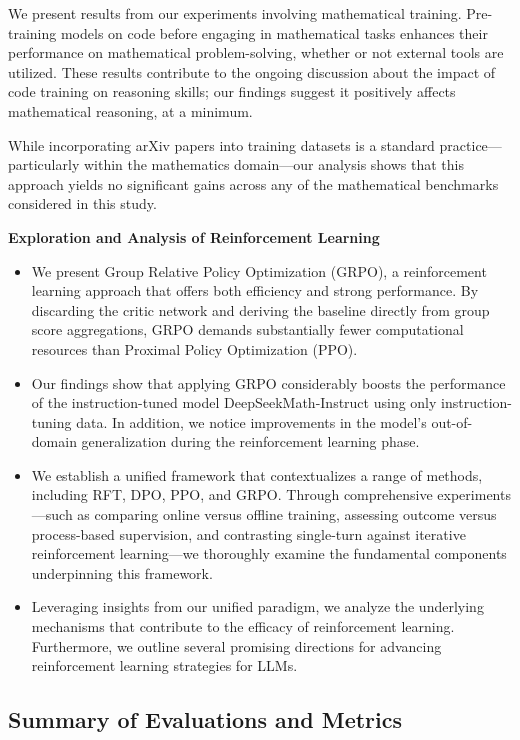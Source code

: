\item We present results from our experiments involving mathematical training. Pre-training models on code before engaging in mathematical tasks enhances their performance on mathematical problem-solving, whether or not external tools are utilized. These results contribute to the ongoing discussion about the impact of code training on reasoning skills; our findings suggest it positively affects mathematical reasoning, at a minimum.

\item While incorporating arXiv papers into training datasets is a standard practice—particularly within the mathematics domain—our analysis shows that this approach yields no significant gains across any of the mathematical benchmarks considered in this study.

\textbf{Exploration and Analysis of Reinforcement Learning}

\begin{itemize}[topsep=0pt]
    \item We present Group Relative Policy Optimization (GRPO), a reinforcement learning approach that offers both efficiency and strong performance. By discarding the critic network and deriving the baseline directly from group score aggregations, GRPO demands substantially fewer computational resources than Proximal Policy Optimization (PPO).
    \item Our findings show that applying GRPO considerably boosts the performance of the instruction-tuned model DeepSeekMath-Instruct using only instruction-tuning data. In addition, we notice improvements in the model's out-of-domain generalization during the reinforcement learning phase.
    \item We establish a unified framework that contextualizes a range of methods, including RFT, DPO, PPO, and GRPO. Through comprehensive experiments—such as comparing online versus offline training, assessing outcome versus process-based supervision, and contrasting single-turn against iterative reinforcement learning—we thoroughly examine the fundamental components underpinning this framework.
    \item Leveraging insights from our unified paradigm, we analyze the underlying mechanisms that contribute to the efficacy of reinforcement learning. Furthermore, we outline several promising directions for advancing reinforcement learning strategies for LLMs.
\end{itemize}

\subsection{Summary of Evaluations and Metrics}

